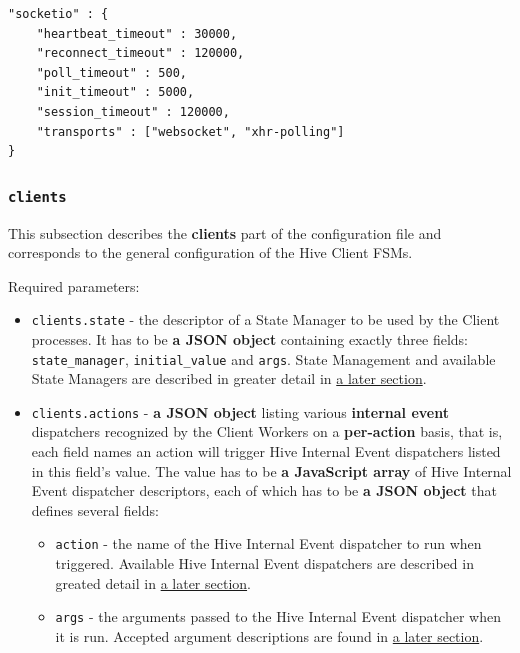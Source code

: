\documentclass[a4paper]{article}
\begin{document}
\begin{verbatim}
"socketio" : {
    "heartbeat_timeout" : 30000,
    "reconnect_timeout" : 120000,
    "poll_timeout" : 500,
    "init_timeout" : 5000,
    "session_timeout" : 120000,
    "transports" : ["websocket", "xhr-polling"]
}
\end{verbatim}
\subsubsection{\texttt{clients}}
\label{sec-3-1-3}

This subsection describes the \textbf{clients} part of the configuration file and corresponds to the general configuration of the Hive Client FSMs.

\noindent
Required parameters:


\begin{itemize}
\item \texttt{clients.state} - the descriptor of a State Manager to be used by the Client processes. It has to be \textbf{a JSON object} containing exactly three fields: \texttt{state\_manager}, \texttt{initial\_value} and \texttt{args}. State Management and available State Managers are described in greater detail in \hyperref[sec-7-1-5]{a later section}.
\end{itemize}

\label{ref-events_config}

\begin{itemize}
\item \texttt{clients.actions} - \textbf{a JSON object} listing various \textbf{internal event} dispatchers recognized by the Client Workers on a \textbf{per-action} basis, that is, each field names an action will trigger Hive Internal Event dispatchers listed in this field's value. The value has to be \textbf{a JavaScript array} of Hive Internal Event dispatcher descriptors, each of which has to be \textbf{a JSON object} that defines several fields:
\begin{itemize}
\item \texttt{action} - the name of the Hive Internal Event dispatcher to run when triggered. Available Hive Internal Event dispatchers are described in greated detail in \hyperref[sec-9-3]{a later section}.
\item \texttt{args} - the arguments passed to the Hive Internal Event dispatcher when it is run. Accepted argument descriptions are found in \hyperref[sec-9-3]{a later section}.
\end{itemize}
\end{itemize}
\end{document}
